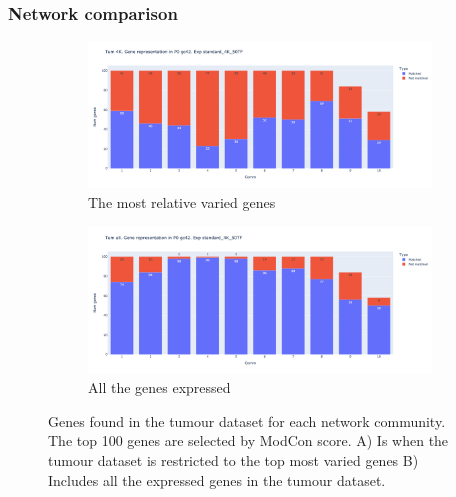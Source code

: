 \subsubsection{Network comparison}






\begin{figure}[!htb]
    \hfill
    \begin{subfigure}[b]{0.47\textwidth}
        \centering
        \includegraphics[width=\textwidth,keepaspectratio]{Sections/Network_I/Resources/P0/4K_p0_modConMev_rep_standard_4K_50TF.png}
        \caption{The most relative varied genes}
    \end{subfigure}
    \hfill
    \begin{subfigure}[b]{0.47\textwidth}
        \centering
        \includegraphics[width=\textwidth,keepaspectratio]{Sections/Network_I/Resources/P0/10K_p0_modConMev_rep_standard_4K_50TF.png}
        \caption{All the genes expressed}
    \end{subfigure}
    \hfill
    \caption{Genes found in the tumour dataset for each network community. The top 100 genes are selected by ModCon score. A) Is when the tumour dataset is restricted to the top most varied genes B) Includes all the expressed genes in the tumour dataset. }
    \label{fig:N_I:p0_mev_rep}
\end{figure}




